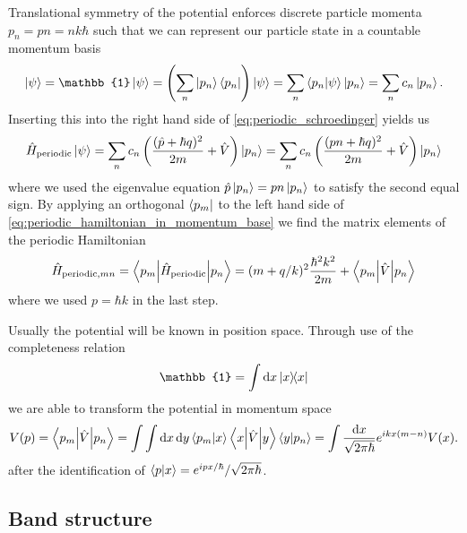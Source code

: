 Translational symmetry of the potential enforces discrete particle momenta
$p_n=pn=nk\hbar$ such that we can represent our particle state in a
countable momentum basis
\begin{equation}
  \ket{\psi}
  =\mathbb{1}\ket{\psi}
  =\left(\sum_n\ket{p_n}\bra{p_n}\right)\ket{\psi}
  =\sum_n\braket{p_n}{\psi}\ket{p_n}
  =\sum_nc_n\ket{p_n}
  \label{eq:countable_momentum_state}.
\end{equation}
Inserting this into the right hand side of \cref{eq:periodic_schroedinger}
yields us
\begin{equation}
  \hat{H}_\text{periodic}\ket{\psi}
  =\sum_nc_n\left(\frac{(\hat{p}+\hbar q)^2}{2m}+\hat{V}\right)\ket{p_n}
  =\sum_nc_n\left(\frac{(pn+\hbar q)^2}{2m}+\hat{V}\right)\ket{p_n}
  \label{eq:periodic_hamiltonian_in_momentum_base}
\end{equation}
where we used the eigenvalue equation $\hat{p}\ket{p_n}=pn\ket{p_n}$ to
satisfy the second equal sign. By applying an orthogonal $\bra{p_m}$ to the
left hand side of \cref{eq:periodic_hamiltonian_in_momentum_base} we find
the matrix elements of the periodic Hamiltonian
\begin{equation}
  \hat{H}_{\text{periodic},mn}
  =\mel**{p_m}{\hat{H}_\text{periodic}}{p_n}
  =(m+q/k)^2\frac{\hbar^2k^2}{2m}+\mel**{p_m}{\hat{V}}{p_n}
  \label{eq:periodic_hamiltonian_elements}
\end{equation}
where we used $p=\hbar k$ in the last step.

Usually the potential will be known in position space. Through use of the
completeness relation
\begin{equation}
  \mathbb{1}
  =\int\dd{x}\op{x}{x}
  \label{eq:continous_completeness_relation}
\end{equation}
we are able to transform the potential in momentum space
\begin{equation}
  V(p)
  =\mel**{p_m}{\hat{V}}{p_n}
  =\int\int\dd{x}\dd{y}\braket{p_m}{x}\mel**{x}{\hat{V}}{y}\braket{y}{p_n}
  =\int\frac{\dd{x}}{\sqrt{2\pi\hbar}}e^{ikx(m-n)}V(x)
  \label{eq:potential_fourier_transform}.
\end{equation}
after the identification of $\braket{p}{x}=e^{ipx/\hbar}/\sqrt{2\pi\hbar}$.

\subsection{Band structure}


